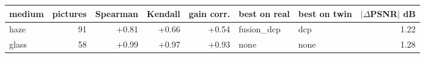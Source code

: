 \begin{tabular}{lrrrrllr}
\toprule
medium & pictures & Spearman & Kendall & gain corr. & best on real & best on twin & $|\Delta$PSNR$|$ dB \\
\midrule
haze & 91 & +0.81 & +0.66 & +0.54 & fusion\_dcp & dcp & 1.22 \\
glass & 58 & +0.99 & +0.97 & +0.93 & none & none & 1.28 \\
\bottomrule
\end{tabular}
